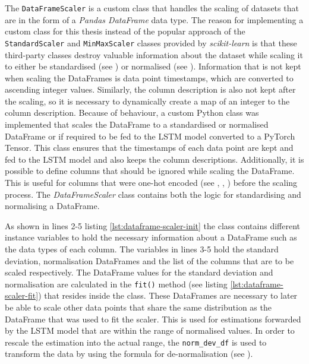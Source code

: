     The \texttt{DataFrameScaler} is a custom class that handles the scaling of datasets that are in the form of a \emph{Pandas DataFrame} data type. 
    The reason for implementing a custom class for this thesis instead of the popular approach of the \texttt{StandardScaler} and \texttt{MinMaxScaler} classes provided by \emph{scikit-learn} is that these third-party classes destroy valuable information about the dataset while scaling it to either be standardised (see ) or normalised (see ). 
    Information that is not kept when scaling the DataFrames is data point timestamps, which are converted to ascending integer values. Similarly, the column description is also not kept after the scaling, so it is necessary to dynamically create a map of an integer to the column description.
    Because of behaviour, a custom Python class was implemented that scales the DataFrame to a standardised or normalised DataFrame or if required to be fed to the LSTM model converted to a PyTorch Tensor.
    This class ensures that the timestamps of each data point are kept and fed to the LSTM model and also keeps the column descriptions. Additionally, it is possible to define columns that should be ignored while scaling the DataFrame. This is useful for columns that were one-hot encoded (see , , ) before the scaling process.
    The \emph{DataFrameScaler} class contains both the logic for standardising and normalising a DataFrame.

    

    As shown in lines 2-5 listing \ref{lst:dataframe-scaler-init} the class contains different instance variables to hold the necessary information about a DataFrame such as the data types of each column.
    The variables in lines 3-5 hold the standard deviation, normalisation DataFrames and the list of the columns that are to be scaled respectively. The DataFrame values for the standard deviation and normalisation are calculated in the \texttt{fit()} method (see listing \ref{lst:dataframe-scaler-fit}) that resides inside the class.
    These DataFrames are necessary to later be able to scale other data points that share the same distribution as the DataFrame that was used to fit the scaler. 
    This is used for estimations forwarded by the LSTM model that are within the range of normalised values.
    In order to rescale the estimation into the actual range, the \texttt{norm\_dev\_df} is used to transform the data by using the formula for de-normalisation (see ).

